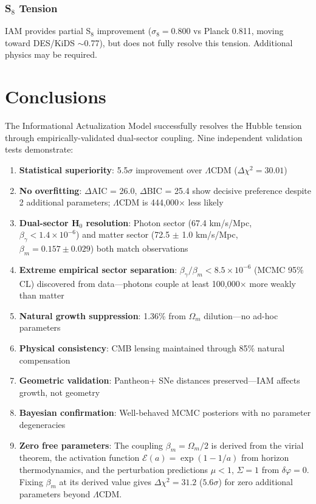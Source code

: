 \documentclass[11pt,letterpaper]{article}
\begin{document}
\subsubsection{S$_8$ Tension}

IAM provides partial S$_8$ improvement ($\sigma_8 = 0.800$ vs Planck 0.811, moving toward DES/KiDS $\sim$0.77), but does not fully resolve this tension. Additional physics may be required.

\section{Conclusions}

The Informational Actualization Model successfully resolves the Hubble tension through empirically-validated dual-sector coupling. Nine independent validation tests demonstrate:

\begin{enumerate}
\item \textbf{Statistical superiority}: 5.5$\sigma$ improvement over $\Lambda$CDM ($\Delta\chi^2 = 30.01$)
\item \textbf{No overfitting}: $\Delta$AIC = 26.0, $\Delta$BIC = 25.4 show decisive preference despite 2 additional parameters; $\Lambda$CDM is 444,000$\times$ less likely
\item \textbf{Dual-sector H$_0$ resolution}: Photon sector (67.4 km/s/Mpc, $\beta_\gamma < 1.4 \times 10^{-6}$) and matter sector (72.5 $\pm$ 1.0 km/s/Mpc, $\beta_m = 0.157 \pm 0.029$) both match observations
\item \textbf{Extreme empirical sector separation}: $\beta_\gamma/\beta_m < 8.5 \times 10^{-6}$ (MCMC 95\% CL) discovered from data---photons couple at least 100,000$\times$ more weakly than matter
\item \textbf{Natural growth suppression}: 1.36\% from $\Omega_m$ dilution---no ad-hoc parameters
\item \textbf{Physical consistency}: CMB lensing maintained through 85\% natural compensation
\item \textbf{Geometric validation}: Pantheon+ SNe distances preserved---IAM affects growth, not geometry
\item \textbf{Bayesian confirmation}: Well-behaved MCMC posteriors with no parameter degeneracies
\item \textbf{Zero free parameters}: The coupling $\beta_m = \Omega_m/2$ is derived from the virial theorem, the activation function $\mathcal{E}(a) = \exp(1-1/a)$ from horizon thermodynamics, and the perturbation predictions $\mu < 1$, $\Sigma = 1$ from $\delta\varphi = 0$. Fixing $\beta_m$ at its derived value gives $\Delta\chi^2 = 31.2$ ($5.6\sigma$) for zero additional parameters beyond $\Lambda$CDM.
\end{enumerate}
\end{document}
